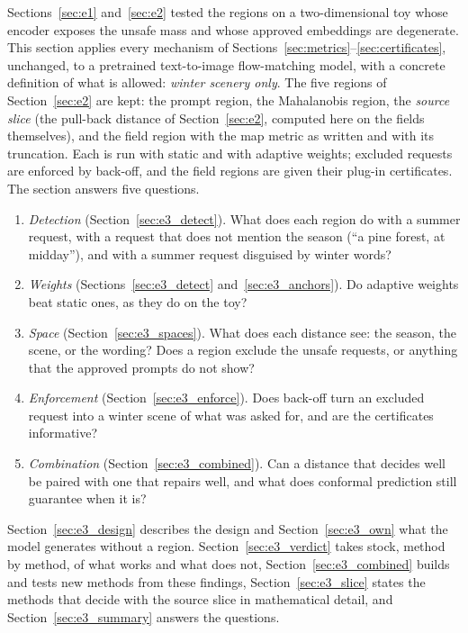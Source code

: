\documentclass{article}
\theoremstyle{plain}
\theoremstyle{remark}
\begin{document}
Sections~\ref{sec:e1} and~\ref{sec:e2} tested the regions on a two-dimensional toy whose encoder exposes the unsafe mass and whose
approved embeddings are degenerate. This section applies every mechanism of Sections~\ref{sec:metrics}--\ref{sec:certificates},
unchanged, to a pretrained text-to-image flow-matching model, with a concrete definition of what is allowed: \emph{winter scenery
only}. The five regions of Section~\ref{sec:e2} are kept: the prompt region, the Mahalanobis region, the \emph{source slice} (the
pull-back distance of Section~\ref{sec:e2}, computed here on the fields themselves), and the field region with the map metric as
written and with its truncation. Each is run with static and with adaptive weights; excluded requests are enforced by back-off, and
the field regions are given their plug-in certificates. The section answers five questions.
\begin{enumerate}[label=(Q\arabic*)]
\item \emph{Detection} (Section~\ref{sec:e3_detect}). What does each region do with a summer request, with a request that does not
mention the season (``a pine forest, at midday''), and with a summer request disguised by winter words?
\item \emph{Weights} (Sections~\ref{sec:e3_detect} and~\ref{sec:e3_anchors}). Do adaptive weights beat static ones, as they do on
the toy?
\item \emph{Space} (Section~\ref{sec:e3_spaces}). What does each distance see: the season, the scene, or the wording? Does a region
exclude the unsafe requests, or anything that the approved prompts do not show?
\item \emph{Enforcement} (Section~\ref{sec:e3_enforce}). Does back-off turn an excluded request into a winter scene of what was asked
for, and are the certificates informative?
\item \emph{Combination} (Section~\ref{sec:e3_combined}). Can a distance that decides well be paired with one that repairs well,
and what does conformal prediction still guarantee when it is?
\end{enumerate}
Section~\ref{sec:e3_design} describes the design and Section~\ref{sec:e3_own} what the model generates without a region.
Section~\ref{sec:e3_verdict} takes stock, method by method, of what works and what does not, Section~\ref{sec:e3_combined} builds and
tests new methods from these findings, Section~\ref{sec:e3_slice} states the methods that decide with the source slice in mathematical
detail, and Section~\ref{sec:e3_summary} answers the questions.
\end{document}
